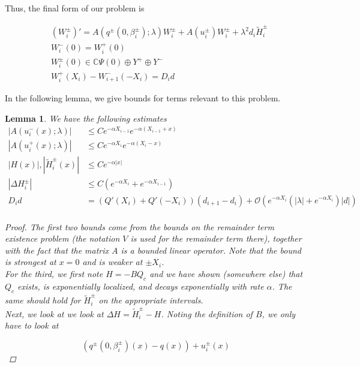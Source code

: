 \documentclass[12pt]{article}
\def\C{{\mathbb C}}
\newtheorem{lemma}{Lemma}
\begin{document}
Thus, the final form of our problem is

\begin{align}
&(W_i^\pm)' = A(q^\pm(0, \beta_i^\pm); \lambda) W_i^\pm + A(u_i^\pm) W_i^\pm + \lambda^2 d_i \tilde{H}_i^\pm \\
&W_i^-(0) = W_i^+(0) \\
&W_i^\pm(0) \in \C \Psi(0) \oplus Y^+ \oplus Y^- \\
&W_i^+(X_i) - W_{i+1}^-(-X_i) = D_i d
\end{align}

In the following lemma, we give bounds for terms relevant to this problem.


\begin{lemma}\label{problembounds}
We have the following estimates
\begin{align*}
|A(u_i^-(x); \lambda)| &\leq C e^{-\alpha X_{i-1}} e^{-\alpha(X_{i-1} + x) } \\
|A(u_i^+(x); \lambda)| &\leq C e^{-\alpha X_i} e^{-\alpha(X_i - x) } \\
|H(x)|, |\tilde{H}_i^\pm(x)| &\leq C e^{-\alpha |x|} \\
|\Delta H_i^\pm| &\leq C(e^{-\alpha X_i} + e^{-\alpha X_{i-1}} ) \\
D_i d &= ( Q'(X_i) + Q'(-X_i))(d_{i+1} - d_i ) + \mathcal{O} \left( e^{-\alpha X_i} \left( |\lambda| +  e^{-\alpha X_i}  \right) |d| \right) \\
\end{align*}

\begin{proof}
The first two bounds come from the bounds on the remainder term existence problem (the notation $V$ is used for the remainder term there), together with the fact that the matrix $A$ is a bounded linear operator. Note that the bound is strongest at $x = 0$ and is weaker at $\pm X_i$. \\

For the third, we first note $H = -B Q_c$ and we have shown (somewhere else) that $Q_c$ exists, is exponentially localized, and decays exponentially with rate $\alpha$. The same should hold for $\tilde{H}_i^\pm$ on the appropriate intervals.\\
 
Next, we look at we look at $\Delta H = \tilde{H}_i^\pm - H$. Noting the definition of $B$, we only have to look at 

\[
(q^\pm(0, \beta_i^\pm)(x) - q(x)) + u_i^\pm(x)
\]


\end{proof}
\end{lemma}
\end{document}
